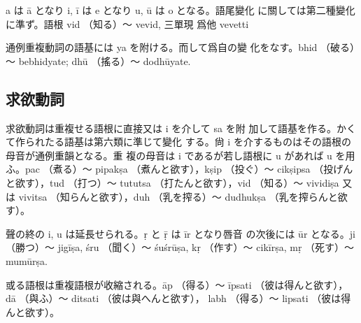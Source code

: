 a は ā となり i, ī は e となり u, ū は o となる。語尾變化
に關しては第二種變化に準ず。語根 vid （知る）～ vevid, 三單現
爲他 vevetti

\numberParagraph
通例重複動詞の語基には ya を附ける。而して爲自の變
化をなす。bhid （破る）～ bebhidyate; dhū （搖る）～ dodhūyate.

\subsection{求欲動詞}
\numberParagraph
求欲動詞は重複せる語根に直接又は i を介して sa を附
加して語基を作る。かくて作られたる語基は第六類に準じて變化
する。尙 i を介するものはその語根の母音が通例重韻となる。重
複の母音は i であるが若し語根に u があれば u を用ふ。pac
（煮る）～ pipakṣa （煮んと欲す），kṣip （投ぐ）～ cikṣipsa （投げん
と欲す），tud （打つ）～ tututsa （打たんと欲す），vid （知る）～
vividiṣa 又は vivitsa （知らんと欲す），duh （乳を搾る）～
dudhukṣa （乳を搾らんと欲す）。

\numberParagraph
聲の終の i, u は延長せられる。ṛ と ṝ は īr となり唇音
の次後には ūr となる。ji （勝つ）～ jigīṣa, śru （聞く）～ śuśrūṣa,
kṛ （作す）～ cikīrṣa, mṛ （死す）～ mumūrṣa.

\numberParagraph
或る語根は重複語根が收縮される。āp （得る）～ īpsati
（彼は得んと欲す），dā （與ふ）～ ditsati （彼は與へんと欲す），
labh （得る）～ lipsati （彼は得んと欲す）。

